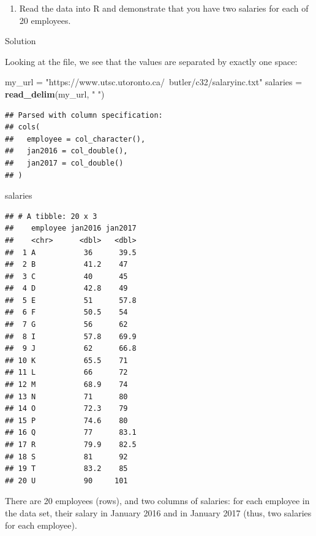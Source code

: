 \documentclass[]{tufte-book}
\newenvironment{Shaded}{}{}
\newcommand{\KeywordTok}[1]{\textcolor[rgb]{0.00,0.44,0.13}{\textbf{#1}}}
\newcommand{\NormalTok}[1]{#1}
\newcommand{\StringTok}[1]{\textcolor[rgb]{0.25,0.44,0.63}{#1}}
\providecommand{\tightlist}{%
  \setlength{\itemsep}{0pt}\setlength{\parskip}{0pt}}
\theoremstyle{definition}
\theoremstyle{definition}
\theoremstyle{definition}
\theoremstyle{remark}
\begin{document}
\begin{enumerate}
\def\labelenumi{(\alph{enumi})}
\tightlist
\item
  Read the data into R and demonstrate that you have two salaries for
  each of 20 employees.
\end{enumerate}

Solution

Looking at the file, we see that the values are separated by exactly one
space:

\begin{Shaded}
\begin{Highlighting}[]
\NormalTok{my_url =}\StringTok{ "https://www.utsc.utoronto.ca/~butler/c32/salaryinc.txt"}
\NormalTok{salaries =}\StringTok{ }\KeywordTok{read_delim}\NormalTok{(my_url, }\StringTok{" "}\NormalTok{)}
\end{Highlighting}
\end{Shaded}

\begin{verbatim}
## Parsed with column specification:
## cols(
##   employee = col_character(),
##   jan2016 = col_double(),
##   jan2017 = col_double()
## )
\end{verbatim}

\begin{Shaded}
\begin{Highlighting}[]
\NormalTok{salaries}
\end{Highlighting}
\end{Shaded}

\begin{verbatim}
## # A tibble: 20 x 3
##    employee jan2016 jan2017
##    <chr>      <dbl>   <dbl>
##  1 A           36      39.5
##  2 B           41.2    47  
##  3 C           40      45  
##  4 D           42.8    49  
##  5 E           51      57.8
##  6 F           50.5    54  
##  7 G           56      62  
##  8 I           57.8    69.9
##  9 J           62      66.8
## 10 K           65.5    71  
## 11 L           66      72  
## 12 M           68.9    74  
## 13 N           71      80  
## 14 O           72.3    79  
## 15 P           74.6    80  
## 16 Q           77      83.1
## 17 R           79.9    82.5
## 18 S           81      92  
## 19 T           83.2    85  
## 20 U           90     101
\end{verbatim}

There are 20 employees (rows), and two columns of salaries: for each
employee in the data set, their salary in January 2016 and in January
2017 (thus, two salaries for each employee).
\end{document}
